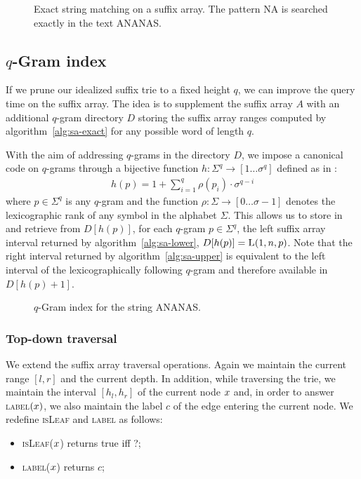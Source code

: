 \begin{figure}[h]
\begin{center}
\caption[Exact string matching on a suffix array.]{Exact string matching on a suffix array. The pattern NA is searched exactly in the text ANANAS.}
\label{fig:sa-exact}
%
\end{center}
\end{figure}

\subsection{$q$-Gram index}

If we prune our idealized suffix trie to a fixed height $q$, we can improve the query time on the suffix array.
The idea is to supplement the suffix array $A$ with an additional $q$-gram directory $D$ storing the suffix array ranges computed by algorithm~\ref{alg:sa-exact} for any possible word of length $q$.

With the aim of addressing $q$-grams in the directory $D$, we impose a canonical code on $q$-grams through a bijective function $h : \Sigma^q \rightarrow [1 \dots \sigma^q]$ defined as in \citep{Knuth1973}:
\begin{eqnarray}
h(p) = 1 + \sum_{i=1}^{q}{\rho(p_i) \cdot \sigma^{q-i}}
\end{eqnarray}
where $p \in \Sigma^q$ is any $q$-gram and the function $\rho : \Sigma \rightarrow [0 \dots \sigma - 1]$ denotes the lexicographic rank of any symbol in the alphabet $\Sigma$.
This allows us to store in and retrieve from $D[h(p)]$, for each $q$-gram $p \in \Sigma^q$, the left suffix array interval returned by algorithm~\ref{alg:sa-lower}, \ie $D[h(p)] = \textsc{L}(1,n,p)$.
Note that the right interval returned by algorithm~\ref{alg:sa-upper} is equivalent to the left interval of the lexicographically following $q$-gram and therefore available in $D[h(p)+1]$.

\begin{figure}[h]
\caption{$q$-Gram index for the string ANANAS.}
\label{fig:qgram}
\begin{center}
\end{center}
\end{figure}

\subsubsection{Top-down traversal}

We extend the suffix array traversal operations.
Again we maintain the current range $[l,r]$ and the current depth.
In addition, while traversing the trie, we maintain the interval $[h_l,h_r]$ of the current node $x$ and, in order to answer \textsc{label}$(x)$, we also maintain the label $c$ of the edge entering the current node.
We redefine \textsc{isLeaf} and \textsc{label} as follows:
\begin{itemize}
\item \textsc{isLeaf}($x$) returns true iff ?;
\item \textsc{label}($x$) returns $c$;
\end{itemize}

